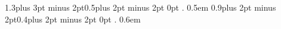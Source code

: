   {1.3\baselineskip plus 3pt minus 2pt}{0.5\baselineskip plus 2pt minus 2pt}
  {\normalfont}{0pt}
  {\sffamily\bfseries\large\color{TextColor}}{.}
  {0.5em}
  {}
  {0.9\baselineskip plus 2pt minus 2pt}{0.4\baselineskip plus 2pt minus 2pt}
  {\normalfont}{0pt}
  {\sffamily\bfseries\color{TextColor}}{.}
  {0.6em}
  {\thmnote{ {\normalfont\sffamily\footnotesize\color{MutedColor}[#3]}}}
\theoremstyle{acadexo}
\newtheorem{exercice}{Exercice}
\theoremstyle{acadquestion}
\newtheorem{question}{Question}[exercice]



